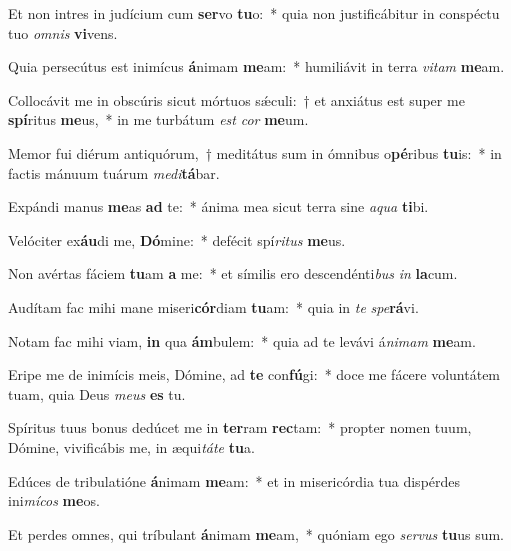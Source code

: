 \item Et non intres in judícium cum \textbf{ser}vo \textbf{tu}o:~* quia non justificábitur in conspéctu tuo \textit{om}\textit{nis} \textbf{vi}vens.
\item Quia persecútus est inimícus \textbf{á}nimam \textbf{me}am:~* humiliávit in terra \textit{vi}\textit{tam} \textbf{me}am.
\item Collocávit me in obscúris sicut mórtuos sǽculi:~† et anxiátus est super me \textbf{spí}ritus \textbf{me}us,~* in me turbátum \textit{est} \textit{cor} \textbf{me}um.
\item Memor fui diérum antiquórum,~† meditátus sum in ómnibus o\textbf{pé}ribus \textbf{tu}is:~* in factis mánuum tuárum \textit{me}\textit{di}\textbf{tá}bar.
\item Expándi manus \textbf{me}as \textbf{ad} te:~* ánima mea sicut terra sine \textit{a}\textit{qua} \textbf{ti}bi.
\item Velóciter ex\textbf{áu}di me, \textbf{Dó}mine:~* defécit spí\textit{ri}\textit{tus} \textbf{me}us.
\item Non avértas fáciem \textbf{tu}am \textbf{a} me:~* et símilis ero descendénti\textit{bus} \textit{in} \textbf{la}cum.
\item Audítam fac mihi mane miseri\textbf{cór}diam \textbf{tu}am:~* quia in \textit{te} \textit{spe}\textbf{rá}vi.
\item Notam fac mihi viam, \textbf{in} qua \textbf{ám}bulem:~* quia ad te levávi á\textit{ni}\textit{mam} \textbf{me}am.
\item Eripe me de inimícis meis, Dómine, ad \textbf{te} con\textbf{fú}gi:~* doce me fácere voluntátem tuam, quia Deus \textit{me}\textit{us} \textbf{es} tu.
\item Spíritus tuus bonus dedúcet me in \textbf{ter}ram \textbf{rec}tam:~* propter nomen tuum, Dómine, vivificábis me, in æqui\textit{tá}\textit{te} \textbf{tu}a.
\item Edúces de tribulatióne \textbf{á}nimam \textbf{me}am:~* et in misericórdia tua dispérdes ini\textit{mí}\textit{cos} \textbf{me}os.
\item Et perdes omnes, qui tríbulant \textbf{á}nimam \textbf{me}am,~* quóniam ego \textit{ser}\textit{vus} \textbf{tu}us sum.
